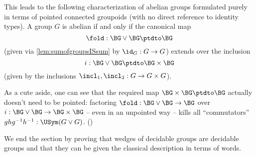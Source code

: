 \begin{xca}\label{xca:whatAREabeliangroups}
  This leads to the following characterization of abelian groups
  formulated purely in terms of pointed connected groupoids
  (with no direct reference to identity types).
  A group $G$ is abelian if and only if the canonical map
  \[
    \fold :\BG\vee \BG\ptdto \BG
  \]
  (given via \cref{lem:sumofgroupsISsum} by $\id_G:G\to G$)
  extends over the inclusion
  \[
    i:\BG\vee \BG\ptdto \BG\times \BG
  \]
  (given by the inclusions $\incl_1,\incl_2:G\to G\times G$).

  As a cute aside, one can see that the required map $\BG\times\BG\ptdto\BG$
  actually doesn't need to be pointed:
  factoring
  $\fold:\BG\vee\BG\to\BG$ over $i:\BG\vee\BG\to\BG\times\BG$
  -- even in an unpointed way -- kills all ``commutators''
  $ghg^{-1}h^{-1}:\USym(G\vee G)$.
  ()
\end{xca}

We end the section by proving that wedges of decidable groups are decidable groups and that they can be given the classical description in terms of words.


